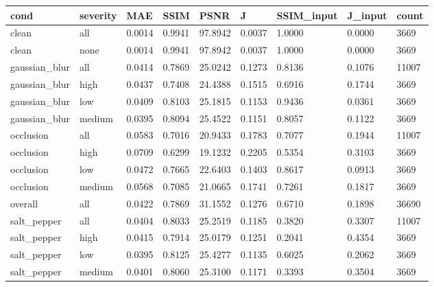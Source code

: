 \begin{tabular}{lllllllll}
\hline
cond & severity & MAE & SSIM & PSNR & J & SSIM\_input & J\_input & count \\
\hline
clean & all & 0.0014 & 0.9941 & 97.8942 & 0.0037 & 1.0000 & 0.0000 & 3669 \\
clean & none & 0.0014 & 0.9941 & 97.8942 & 0.0037 & 1.0000 & 0.0000 & 3669 \\
gaussian\_blur & all & 0.0414 & 0.7869 & 25.0242 & 0.1273 & 0.8136 & 0.1076 & 11007 \\
gaussian\_blur & high & 0.0437 & 0.7408 & 24.4388 & 0.1515 & 0.6916 & 0.1744 & 3669 \\
gaussian\_blur & low & 0.0409 & 0.8103 & 25.1815 & 0.1153 & 0.9436 & 0.0361 & 3669 \\
gaussian\_blur & medium & 0.0395 & 0.8094 & 25.4522 & 0.1151 & 0.8057 & 0.1122 & 3669 \\
occlusion & all & 0.0583 & 0.7016 & 20.9433 & 0.1783 & 0.7077 & 0.1944 & 11007 \\
occlusion & high & 0.0709 & 0.6299 & 19.1232 & 0.2205 & 0.5354 & 0.3103 & 3669 \\
occlusion & low & 0.0472 & 0.7665 & 22.6403 & 0.1403 & 0.8617 & 0.0913 & 3669 \\
occlusion & medium & 0.0568 & 0.7085 & 21.0665 & 0.1741 & 0.7261 & 0.1817 & 3669 \\
overall & all & 0.0422 & 0.7869 & 31.1552 & 0.1276 & 0.6710 & 0.1898 & 36690 \\
salt\_pepper & all & 0.0404 & 0.8033 & 25.2519 & 0.1185 & 0.3820 & 0.3307 & 11007 \\
salt\_pepper & high & 0.0415 & 0.7914 & 25.0179 & 0.1251 & 0.2041 & 0.4354 & 3669 \\
salt\_pepper & low & 0.0395 & 0.8125 & 25.4277 & 0.1135 & 0.6025 & 0.2062 & 3669 \\
salt\_pepper & medium & 0.0401 & 0.8060 & 25.3100 & 0.1171 & 0.3393 & 0.3504 & 3669 \\
\hline
\end{tabular}
